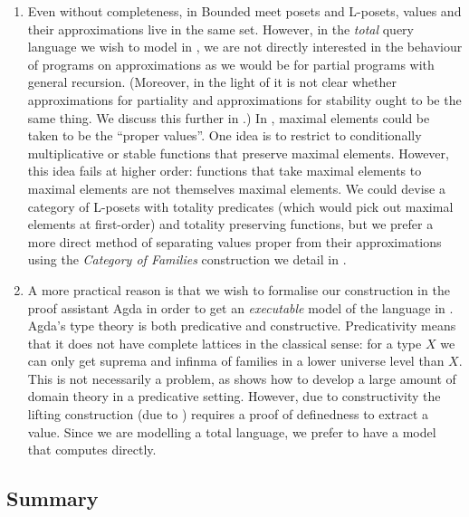 \begin{enumerate}
\item Even without completeness, in Bounded meet posets and L-posets,
  values and their approximations live in the same set. However, in
  the \emph{total} query language we wish to model in
  , we are not directly interested in the behaviour
  of programs on approximations as we would be for partial programs
  with general recursion. (Moreover, in the light of
   it is not clear whether
  approximations for partiality and approximations for stability ought
  to be the same thing. We discuss this further in
  .) In ,
  maximal elements could be taken to be the ``proper values''. One
  idea is to restrict to conditionally multiplicative or stable
  functions that preserve maximal elements. However, this idea fails
  at higher order: functions that take maximal elements to maximal
  elements are not themselves maximal elements. We could devise a
  category of L-posets with totality predicates (which would pick out
  maximal elements at first-order) and totality preserving functions,
  but we prefer a more direct method of separating values proper from
  their approximations using the \emph{Category of Families}
  construction we detail in .
\item A more practical reason is that we wish to formalise our
  construction in the proof assistant Agda \cite{agda} in order to get
  an \emph{executable} model of the language in
  . Agda's type theory is both predicative and
  constructive. Predicativity means that it does not have complete
  lattices in the classical sense: for a type $X$ we can only get
  suprema and infinma of families in a lower universe level than
  $X$. This is not necessarily a problem, as \citet{dejong21} shows
  how to develop a large amount of domain theory in a predicative
  setting. However, due to constructivity the lifting construction
  (due to \citet{escardo-knapp}) requires a proof of definedness to
  extract a value. Since we are modelling a total language, we prefer
  to have a model that computes directly.
\end{enumerate}

\subsection{Summary}
\label{sec:diff-stab-summary}

